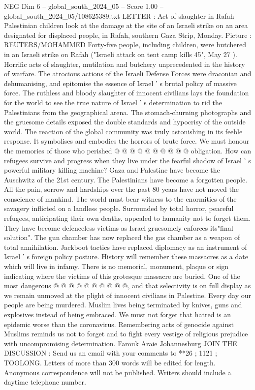 \begin{textsample}{NEG Dim 6 – global\_south\_2024\_05 – Score 1.00 – global\_south\_2024\_05/108625389.txt}  \label{ex:f6_neg_293}
LETTER : Act of slaughter in Rafah Palestinian children look at the damage at the site of an Israeli strike on an area designated for displaced people, in Rafah, southern Gaza Strip, Monday.
Picture : REUTERS/MOHAMMED Forty-five people, including children, were butchered in an Israeli strike on Rafah ("Israeli attack on tent camp kills 45", May 27 ).
Horrific acts of slaughter, mutilation and butchery unprecedented in the history of warfare.
The atrocious actions of the Israeli Defense Forces were draconian and dehumanising, and epitomise the essence of Israel ' s brutal policy of massive force.
The ruthless and bloody slaughter of innocent civilians lays the foundation for the world to see the true nature of Israel ' s determination to rid the Palestinians from the geographical arena.
The stomach-churning photographs and the gruesome details exposed the double standards and hypocrisy of the outside world.
The reaction of the global community was truly astonishing in its feeble response.
It symbolises and embodies the horrors of brute force.
We must honour the memories of those who perished @ @ @ @ @ @ @ @ @ @ obligation.
How can refugees survive and progress when they live under the fearful shadow of Israel ' s powerful military killing machine?
Gaza and Palestine have become the Auschwitz of the 21st century.
The Palestinians have become a forgotten people.
All the pain, sorrow and hardships over the past 80 years have not moved the conscience of mankind.
The world must bear witness to the enormities of the savagery inflicted on a landless people.
Surrounded by total horror, peaceful refugees, anticipating their own deaths, appealed to humanity not to forget them.
They have become defenceless victims as Israel gruesomely enforces its"final solution".
The gun chamber has now replaced the gas chamber as a weapon of total annihilation.
Jackboot tactics have replaced diplomacy as an instrument of Israel ' s foreign policy posture.
History will remember these massacres as a date which will live in infamy.
There is no memorial, monument, plaque or sign indicating where the victims of this grotesque massacre are buried.
One of the most dangerous @ @ @ @ @ @ @ @ @ @, and that selectivity is on full display as we remain unmoved at the plight of innocent civilians in Palestine.
Every day our people are being murdered.
Muslim lives being terminated by knives, guns and explosives instead of being embraced.
We must not forget that hatred is an epidemic worse than the coronavirus.
Remembering acts of genocide against Muslims reminds us not to forget and to fight every vestige of religious prejudice with uncompromising determination.
Farouk Araie Johannesburg JOIN THE DISCUSSION : Send us an email with your comments to **26 ; 1121 ; TOOLONG.
Letters of more than 300 words will be edited for length.
Anonymous correspondence will not be published.
Writers should include a daytime telephone number.

\end{textsample}
